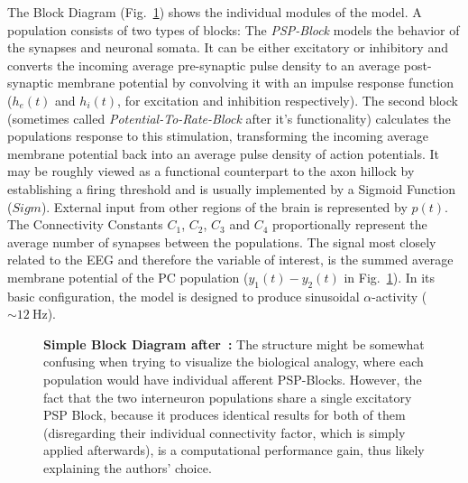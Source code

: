 The Block Diagram (Fig.~\ref{fig:Jansen Rit Simple}) shows the individual modules of the model.
A population consists of two types of blocks:
The \textit{PSP-Block} models the behavior of the synapses and neuronal somata.
It can be either excitatory or inhibitory and converts the incoming average pre-synaptic pulse density to
an average post-synaptic membrane potential by convolving it with an
impulse response function ($h_e(t)$ and $h_i(t)$, for excitation and inhibition respectively).
The second block (sometimes called \textit{Potential-To-Rate-Block} after it's functionality)
calculates the populations response to this stimulation, transforming the incoming
average membrane potential back into an average pulse density of action potentials.
It may be roughly viewed as a functional counterpart to the axon hillock by establishing a firing threshold
and is usually implemented by a Sigmoid Function ($Sigm$).
External input from other regions of the brain is represented by $p(t)$.
The Connectivity Constants $C_1$, $C_2$, $C_3$ and $C_4$ proportionally represent the
average number of synapses between the populations.
The signal most closely related to the EEG and therefore the variable of interest,
is the summed average membrane potential of the PC population ($y_1(t)-y_2(t)$ in Fig.~\ref{fig:Jansen Rit Simple}).
In its basic configuration, the model is designed to produce sinusoidal $\alpha$-activity ($\sim \SI{12}{\hertz}$).


\begin{figure}[H]
    \centering
    
    \caption{\textbf{Simple Block Diagram after~\parencite{jansen_electroencephalogram_1995}:}
    The structure might be somewhat confusing when trying to visualize the biological analogy,
        where each population would have individual afferent PSP-Blocks.
        However, the fact that the two interneuron populations share a single excitatory PSP Block,
        because it produces identical results for both of them (disregarding their individual connectivity factor,
        which is simply applied afterwards), is a computational performance gain,
        thus likely explaining the authors' choice.}
    \label{fig:Jansen Rit Simple}
\end{figure}

